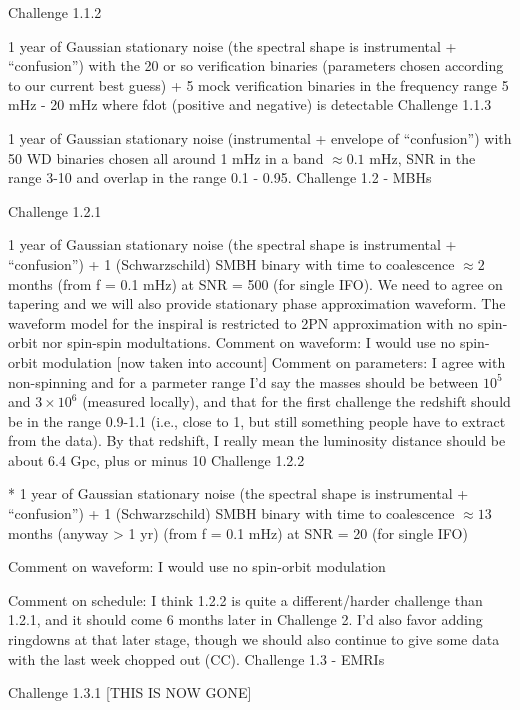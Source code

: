 \documentclass[11pt]{report}
\begin{document}
Challenge 1.1.2

1 year of Gaussian stationary noise (the spectral shape is instrumental + “confusion”) with the 20 or so verification binaries (parameters chosen according to our current best guess) + 5 mock verification binaries in the frequency range 5 mHz - 20 mHz where fdot (positive and negative) is detectable
Challenge 1.1.3

1 year of Gaussian stationary noise (instrumental + envelope of “confusion”) with 50 WD binaries chosen all around 1 mHz in a band $\approx 0.1$ mHz, SNR in the range 3-10 and overlap in the range 0.1 - 0.95.
Challenge 1.2 - MBHs

Challenge 1.2.1

1 year of Gaussian stationary noise (the spectral shape is instrumental + “confusion”) + 1 (Schwarzschild) SMBH binary with time to coalescence $\approx 2$ months (from f = 0.1 mHz) at SNR = 500 (for single IFO). We need to agree on tapering and we will also provide stationary phase approximation waveform. The waveform model for the inspiral is restricted to 2PN approximation with no spin-orbit nor spin-spin modultations.
  Comment on waveform: I would use no spin-orbit modulation [now taken into account]
  Comment on parameters: I agree with non-spinning and for a parmeter range I'd say the masses should 
  be between $10^5$ and $3\times 10^6$ (measured locally), and that for the first challenge the redshift should 
  be in the range 0.9-1.1 (i.e., close to 1, but still something people have to extract from the data).
  By that redshift, I really mean the luminosity distance should be about 6.4 Gpc, plus or minus 10%
Challenge 1.2.2

* 1 year of Gaussian stationary noise (the spectral shape is instrumental + “confusion”) + 1 (Schwarzschild) SMBH binary with time to coalescence $\approx 13$ months (anyway > 1 yr) (from f = 0.1 mHz) at SNR = 20 (for single IFO)

 Comment on waveform: I would use no spin-orbit modulation
 
 Comment on schedule: I think 1.2.2 is quite a different/harder challenge than 1.2.1, and it should come 6 months later in 
 Challenge 2. I'd also favor adding ringdowns at that later stage, though we should also continue to give some
 data with the last week chopped out (CC). 
Challenge 1.3 - EMRIs

Challenge 1.3.1 [THIS IS NOW GONE]
\end{document}
